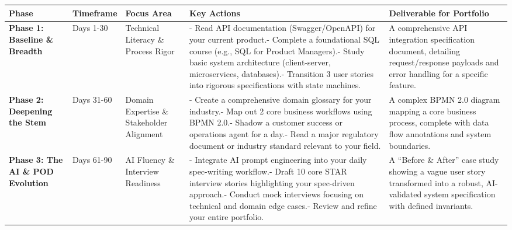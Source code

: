 \documentclass[
  11pt,
  openany,
  oneside]{book}
\begin{document}
\begin{longtable}[]{@{}
  >{\raggedright\arraybackslash}p{}
  >{\raggedright\arraybackslash}p{}
  >{\raggedright\arraybackslash}p{}
  >{\raggedright\arraybackslash}p{}
  >{\raggedright\arraybackslash}p{}@{}}
\toprule\noalign{}
\begin{minipage}[b]{\linewidth}\raggedright
Phase
\end{minipage} & \begin{minipage}[b]{\linewidth}\raggedright
Timeframe
\end{minipage} & \begin{minipage}[b]{\linewidth}\raggedright
Focus Area
\end{minipage} & \begin{minipage}[b]{\linewidth}\raggedright
Key Actions
\end{minipage} & \begin{minipage}[b]{\linewidth}\raggedright
Deliverable for Portfolio
\end{minipage} \\
\midrule\noalign{}
\endhead
\bottomrule\noalign{}
\endlastfoot
\textbf{Phase 1: Baseline \& Breadth} & Days 1-30 & Technical Literacy
\& Process Rigor & - Read API documentation (Swagger/OpenAPI) for your
current product.- Complete a foundational SQL course (e.g., SQL for
Product Managers).- Study basic system architecture (client-server,
microservices, databases).- Transition 3 user stories into rigorous
specifications with state machines. & A comprehensive API integration
specification document, detailing request/response payloads and error
handling for a specific feature. \\
\textbf{Phase 2: Deepening the Stem} & Days 31-60 & Domain Expertise \&
Stakeholder Alignment & - Create a comprehensive domain glossary for
your industry.- Map out 2 core business workflows using BPMN 2.0.-
Shadow a customer success or operations agent for a day.- Read a major
regulatory document or industry standard relevant to your field. & A
complex BPMN 2.0 diagram mapping a core business process, complete with
data flow annotations and system boundaries. \\
\textbf{Phase 3: The AI \& POD Evolution} & Days 61-90 & AI Fluency \&
Interview Readiness & - Integrate AI prompt engineering into your daily
spec-writing workflow.- Draft 10 core STAR interview stories
highlighting your spec-driven approach.- Conduct mock interviews
focusing on technical and domain edge cases.- Review and refine your
entire portfolio. & A ``Before \& After'' case study showing a vague
user story transformed into a robust, AI-validated system specification
with defined invariants. \\
\end{longtable}
\end{document}
